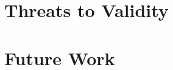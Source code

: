 \section{Threats to Validity}
\label{sec:threats-to-validity}


\section{Future Work}
\label{sec:future-work}


